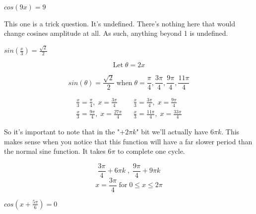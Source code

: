 \documentclass[10pt,letterpaper]{amspset}
\begin{document}
\begin{problem}[8]
    $cos(9x) = 9$    
\end{problem}

\begin{solution}
   This one is a trick question. It's undefined. There's nothing here that would change cosines amplitude at all. As such, anything beyond 1 is undefined. 
\end{solution}


\pagebreak


\begin{problem}[9]
    $sin \left( \frac{x}{3} \right) = \frac{\sqrt{2}}{2}$
\end{problem}

\begin{solution}
   \[\text{Let} \; \theta = 2x\]
   
   \[ sin(\theta) = \frac{\sqrt{2}}{2} \; \text{when} \; \theta = \frac{\pi}{4}, \frac{3\pi}{4}, \frac{9\pi}{4}, \frac{11\pi}{4} \]
   
    \begin{align}
        \frac{x}{3} = \frac{\pi}{4}, \; x = \frac{3\pi}{4} && \frac{x}{3} = \frac{3\pi}{4}, \; x = \frac{9\pi}{4} \\
        \frac{x}{3} = \frac{9\pi}{4}, \; x = \frac{27\pi}{4} && \frac{x}{3} = \frac{11\pi}{4}, \; x = \frac{33\pi}{4}
    \end{align}
    
    So it's important to note that in the "$+ 2\pi k$" bit we'll actually have $6\pi k$. This makes sense when you notice that this function will have a far slower period than the normal sine function. It takes $6 \pi$ to complete one cycle. 
    
    \[\boxed{ \frac{3\pi}{4} + 6\pi k \; , \; \frac{9\pi}{4} + 9\pi k  }\]
    \[\boxed{x = \frac{3\pi}{4} \; \text{for} \; 0 \leq x \leq 2\pi}\]
\end{solution}


\begin{problem}[10]
    $cos(x + \frac{5\pi}{6}) = 0$
\end{problem}
\end{document}
